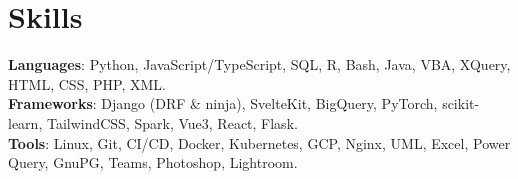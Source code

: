 \documentclass[letterpaper,10pt]{article}
\begin{document}
\section{Skills}
 \begin{itemize}[leftmargin=0.15in, label={}]
    \small{\item{
     \textbf{Languages}{: 
     Python, 
     JavaScript/TypeScript, 
     SQL, 
     R,  
     Bash, 
     Java, 
     VBA, 
     XQuery, 
     HTML, 
     CSS, 
     PHP, 
     XML.
     } \\
     \textbf{Frameworks}{: 
     Django (DRF \& ninja), 
     SvelteKit, 
     BigQuery,
     PyTorch, 
     scikit-learn, 
     TailwindCSS, 
     Spark, 
     Vue3, 
     React, 
     Flask.
     } \\
     \textbf{Tools}{: 
     Linux, 
     Git, 
     CI/CD,
     Docker,
     Kubernetes,
     GCP,
     Nginx, 
     UML, 
     Excel, 
     Power Query, 
     GnuPG, 
     Teams, 
     Photoshop, 
     Lightroom. 
     } \\
    }}
 \end{itemize}


\end{document}
